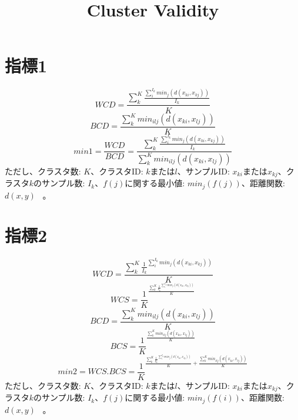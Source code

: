 ﻿\documentclass{article}
\title{Cluster Validity}
\begin{document}
\maketitle
\section{指標1}
\begin{equation}
WCD=\frac{\sum_{k}^{K}{\frac{\sum_{i}^{I_k}{min_j(d(x_{ki},x_{kj}))}}{I_k}}}{K}
\end{equation}
\begin{equation}
BCD=\frac{\sum_{k}^{K}{min_{ilj}(d(x_{ki},x_{lj}))}}{K}
\end{equation}
\begin{equation}
min1=\frac{WCD}{BCD}=\frac{\sum_{k}^{K}{\frac{\sum_{i}^{I_k}{min_j(d(x_{ki},x_{kj}))}}{I_k}}}{\sum_{k}^{K}{min_{ilj}(d(x_{ki},x_{lj}))}}
\end{equation}
ただし、クラスタ数: $K$、クラスタID: $k$または$l$、サンプルID: $x_{ki}$または$x_{kj}$、クラスタ$k$のサンプル数: $I_k$、$f(j)$に関する最小値: $min_j(f(j))$、距離関数:$d(x,y)$  \ 。

\section{指標2}
\begin{equation}
WCD=\frac{\sum_{k}^{K}{{\frac{1}{I_k}}^{\sum_{i}^{I_k}{min_j(d(x_{ki},x_{kj}))}}}}{K}
\end{equation}
\begin{equation}
WCS={\frac{1}{K}}^{\frac{\sum_{k}^{K}{{\frac{1}{I_k}}^{\sum_{i}^{I_k}{min_j(d(x_{ki},x_{kj}))}}}}{K}}
\end{equation}
\begin{equation}
BCD=\frac{\sum_{k}^{K}{min_{ilj}(d(x_{ki},x_{lj}))}}{K}
\end{equation}
\begin{equation}
BCS={\frac{1}{K}}^{\frac{\sum_{k}^{K}{min_{ilj}(d(x_{ki},x_{lj}))}}{K}}
\end{equation}
\begin{equation}
min2=WCS . BCS={\frac{1}{K}}^{\frac{\sum_{k}^{K}{{\frac{1}{I_k}}^{\sum_{i}^{I_k}{min_j(d(x_{ki},x_{kj}))}}}}{K} + \frac{\sum_{k}^{K}{min_{ilj}(d(x_{ki},x_{lj}))}}{K}}
\end{equation}
ただし、クラスタ数: $K$、クラスタID: $k$または$l$、サンプルID: $x_{ki}$または$x_{kj}$、クラスタ$k$のサンプル数: $I_k$、$f(j)$に関する最小値: $min_j(f(i))$、距離関数:$d(x,y)$  \ 。
\end{document}
